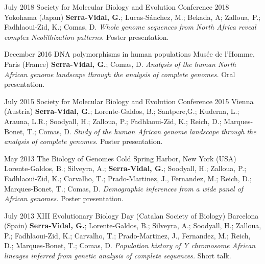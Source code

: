 \documentclass[]{friggeri-cv}
\begin{document}
\begin{entrylist}
	\entry
	{July 2018}
	{Society for Molecular Biology and Evolution Conference 2018}
	{Yokohama (Japan)}
	{\textbf{\boldfont Serra-Vidal, G.}; Lucas-Sánchez, M.; Bekada, A; Zalloua, P.; Fadhlaoui-Zid, K.; Comas, D. \emph{Whole genome sequences from North Africa reveal complex Neolithization patterns.} Poster presentation.}
	
	\entry
	{December 2016}
	{DNA polymorphisms in human populations}
	{Musée de l'Homme, Paris (France)}
	{\textbf{\boldfont Serra-Vidal, G.}; Comas, D. \emph{Analysis of the human North African genome landscape through the analysis of complete genomes.} Oral presentation.}
	
	\entry
	{July 2015}
	{Society for Molecular Biology and Evolution Conference 2015}
	{Vienna (Austria)}
	{\textbf{\boldfont Serra-Vidal, G.}; Lorente-Galdos, B.; Santpere,G.; Kuderna, L.; Arauna, L.R.; Soodyall, H.; Zalloua, P.; Fadhlaoui-Zid, K.; Reich, D.; Marques-Bonet, T.; Comas, D. \emph{Study of the human African genome landscape through the analysis of complete genomes.} Poster presentation.}
	
	
	\entry
	{May 2013}
	{The Biology of Genomes}
	{Cold Spring Harbor, New York (USA)}
	{Lorente-Galdos, B.; Silveyra, A.; \textbf{\boldfont Serra-Vidal, G.}; Soodyall, H.; Zalloua, P.; Fadhlaoui-Zid, K.; Carvalho, T.; Prado-Martinez, J., Fernandez, M.; Reich, D.; Marques-Bonet, T.; Comas, D. \emph{Demographic inferences from a wide panel of African genomes.} Poster presentation.}
	
	\entry
	{July 2013}
	{XIII Evolutionary Biology Day (Catalan Society of Biology)}
	{Barcelona (Spain)}
	{\textbf{\boldfont Serra-Vidal, G.}; Lorente-Galdos, B.; Silveyra, A.; Soodyall, H.; Zalloua, P.; Fadhlaoui-Zid, K.; Carvalho, T.; Prado-Martinez, J., Fernandez, M.; Reich, D.; Marques-Bonet, T.; Comas, D. \emph{Population history of Y chromosome African lineages inferred from genetic analysis of complete sequences.} Short talk.}
	
	
\end{entrylist}
\end{document}
